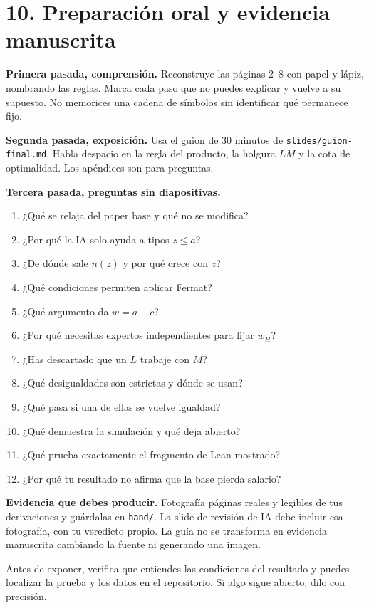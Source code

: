 \documentclass[11pt]{article}
\begin{document}
\section*{10. Preparación oral y evidencia manuscrita}
\textbf{Primera pasada, comprensión.} Reconstruye las páginas 2--8 con papel y lápiz, nombrando las reglas. Marca cada paso que no puedes explicar y vuelve a su supuesto. No memorices una cadena de símbolos sin identificar qué permanece fijo.

\textbf{Segunda pasada, exposición.} Usa el guion de 30 minutos de \texttt{slides/guion-final.md}. Habla despacio en la regla del producto, la holgura $LM$ y la cota de optimalidad. Los apéndices son para preguntas.

\textbf{Tercera pasada, preguntas sin diapositivas.}
\begin{enumerate}
\item ¿Qué se relaja del paper base y qué no se modifica?
\item ¿Por qué la IA solo ayuda a tipos $z\leq a$?
\item ¿De dónde sale $n(z)$ y por qué crece con $z$?
\item ¿Qué condiciones permiten aplicar Fermat?
\item ¿Qué argumento da $w=a-c$?
\item ¿Por qué necesitas expertos independientes para fijar $w_H$?
\item ¿Has descartado que un $L$ trabaje con $M$?
\item ¿Qué desigualdades son estrictas y dónde se usan?
\item ¿Qué pasa si una de ellas se vuelve igualdad?
\item ¿Qué demuestra la simulación y qué deja abierto?
\item ¿Qué prueba exactamente el fragmento de Lean mostrado?
\item ¿Por qué tu resultado no afirma que la base pierda salario?
\end{enumerate}
\textbf{Evidencia que debes producir.} Fotografía páginas reales y legibles de tus derivaciones y guárdalas en \texttt{hand/}. La slide de revisión de IA debe incluir esa fotografía, con tu veredicto propio. La guía no se transforma en evidencia manuscrita cambiando la fuente ni generando una imagen.

Antes de exponer, verifica que entiendes las condiciones del resultado y puedes localizar la prueba y los datos en el repositorio. Si algo sigue abierto, dilo con precisión.
\end{document}
